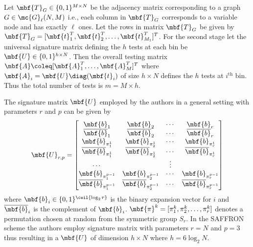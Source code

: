 \documentclass[conference,twocolumn]{IEEEtran}
\begin{document}
 Let $\mbf{T}_{G}\in\{0,1\}^{M\times N }$ be the adjacency matrix corresponding to a graph $G\in\mc{G}_{\ell}(N,M)$ i.e., each column in $\mbf{T}_{G}$ corresponds to a variable node and has exactly $\ell$ ones. Let the rows in matrix $\mbf{T}_{G}$ be given by $\mbf{T}_{G}=[\mbf{t}^{T}_1,\mbf{t}^{T}_{2},\dots, \mbf{t}^{T}_{M_1}]^{T}$. For the second stage let the universal signature matrix defining the $h$ tests at each bin be $\mbf{U}\in\{0,1\}^{h\times N}$. Then the overall testing matrix $\mbf{A}\coleq [\mbf{A}_{1}^{T},\ldots,\mbf{A}_{M}^{T}]^T$ where $\mbf{A}_{i}=\mbf{U} \diag (\mbf{t}_i)$ of size $h\times N$ defines the $h$ tests at $i^{\text{th}}$ bin. Thus the total number of tests is $m=M\times h$.

 
The signature matrix $\mbf{U}$ employed by the authors in a general setting with parameters $r$ and $p$ can be given by
 \begin{align}
\label{Eqn:SignatureMatrix}
\mbf{U}_{r,p}=\begin{bmatrix}
\mbf{b}_1  & \mbf{b}_2 &\cdots & \mbf{b}_r \\
\overline{\mbf{b}}_1 & \overline{\mbf{b}}_2 & \cdots & \overline{\mbf{b}}_r\\
\mbf{b}_{\pi^{1}_{1}} & \mbf{b}_{\pi^{1}_{2}} & \cdots & \mbf{b}_{\pi^{1}_{r}}\\
\overline{\mbf{b}}_{\pi^{1}_{1}} & \overline{\mbf{b}}_{\pi^{1}_{2}} & \cdots & \overline{\mbf{b}}_{\pi^{1}_{r}}\\
\cdots &  &\vdots \\
\mbf{b}_{\pi^{p-1}_{1}} & \mbf{b}_{\pi^{p-1}_{2}} & \cdots & \mbf{b}_{\pi^{p-1}_{r}}\\
\overline{\mbf{b}}_{\pi^{p-1}_{1}} & \overline{\mbf{b}}_{\pi^{p-1}_{2}} & \cdots & \overline{\mbf{b}}_{\pi^{p-1}_{r}}
\end{bmatrix}
\end{align}  
where $\mbf{b}_{i}\in\{0,1\}^{\ceil{\log_{2}r}}$ is the binary expansion vector for $i$ and $\overline{\mbf{b}}_{i}$ is the complement of $\mbf{b}_{i}$. $\mbf{\pi}^{k}=[\pi^{k}_1,\pi^{k}_2,\ldots,\pi^{k}_r]$ denotes a permutation chosen at random from the symmetric group $S_{r}$. In the SAFFRON scheme the authors employ signature matrix with parameters $r=N$ and $p=3$ thus resulting in a $\mbf{U}$ of dimension $h \times N$ where $h=6\log_{2}N$. 
\end{document}
